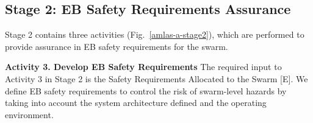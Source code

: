 \documentclass[runningheads]{llncs}
\begin{document}

\subsection{Stage 2: EB Safety Requirements Assurance} \label{framework-stage2}
Stage 2 contains three activities (Fig.~\ref{amlas-a-stage2}), which are performed to provide assurance in EB safety requirements for the swarm. 

\noindent\textbf{Activity 3. Develop EB Safety Requirements} The required input to Activity 3 in Stage 2 is the Safety Requirements Allocated to the Swarm [E]. 
We define EB safety requirements to control the risk of swarm-level hazards by taking into account the system architecture defined and the operating environment. 
\end{document}
